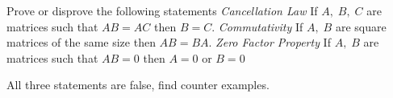 
\begin{Exercise}[
name={},
title={}, 
difficulty=0,
origin={\cite{YL}}]
Prove or disprove the following statements
\Question \textit{Cancellation Law} If $A,\;B,\;C$ are matrices such that $AB=AC$ then $B=C$.
\Question \textit{Commutativity} If $A,\;B$ are square matrices of the same size then $AB=BA$.
\Question \textit{Zero Factor Property} If $A,\;B$ are matrices such that $AB=0$ then $A=0$ or $B=0$
\end{Exercise}

\begin{Answer}
All three statements are false, find counter examples.
\end{Answer}
